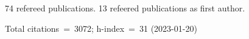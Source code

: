 74 refereed publications. 13 refeered publications as first author.

Total citations~=~3072; h-index~=~31 (2023-01-20)